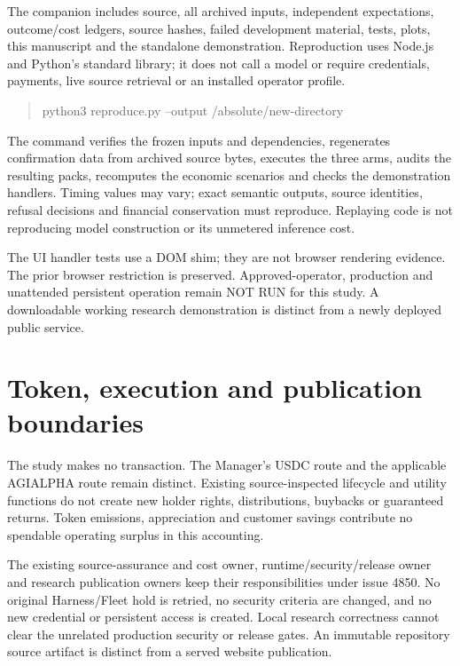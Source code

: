 \documentclass[11pt,a4paper]{article}
\begin{document}
The companion includes source, all archived inputs, independent expectations,
outcome/cost ledgers, source hashes, failed development material, tests, plots,
this manuscript and the standalone demonstration. Reproduction uses Node.js and
Python's standard library; it does not call a model or require credentials,
payments, live source retrieval or an installed operator profile.

\begin{quote}\small\ttfamily
python3 reproduce.py --output /absolute/new-directory
\end{quote}

The command verifies the frozen inputs and dependencies, regenerates confirmation
data from archived source bytes, executes the three arms, audits the resulting
packs, recomputes the economic scenarios and checks the demonstration handlers.
Timing values may vary; exact semantic outputs, source identities, refusal
decisions and financial conservation must reproduce. Replaying code is not
reproducing model construction or its unmetered inference cost.

The UI handler tests use a DOM shim; they are not browser rendering evidence.
The prior browser restriction is preserved. Approved-operator, production and
unattended persistent operation remain NOT RUN for this study. A downloadable
working research demonstration is distinct from a newly deployed public service.

\section{Token, execution and publication boundaries}
The study makes no transaction. The Manager's USDC route and the applicable
AGIALPHA route remain distinct. Existing source-inspected lifecycle and utility
functions do not create new holder rights, distributions, buybacks or guaranteed
returns. Token emissions, appreciation and customer savings contribute no
spendable operating surplus in this accounting.

The existing source-assurance and cost owner, runtime/security/release owner and
research publication owners keep their responsibilities under issue 4850.
No original Harness/Fleet hold is retried, no security criteria are changed, and
no new credential or persistent access is created. Local research correctness
cannot clear the unrelated production security or release gates. An immutable
repository source artifact is distinct from a served website publication.
\end{document}
